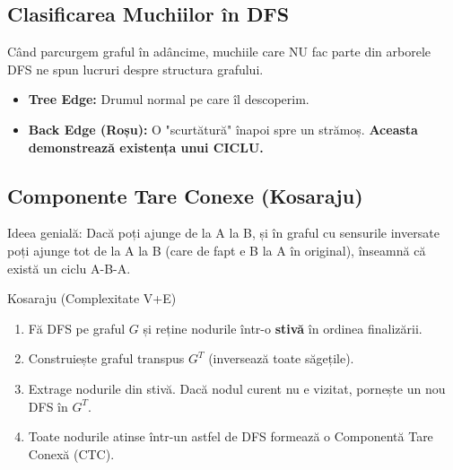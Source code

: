 \documentclass[a4paper,10pt]{article}
\begin{document}
\subsection{Clasificarea Muchiilor în DFS}
Când parcurgem graful în adâncime, muchiile care NU fac parte din arborele DFS ne spun lucruri despre structura grafului.

\begin{center}
\end{center}

\begin{intuition}
\begin{itemize}
    \item \textbf{Tree Edge:} Drumul normal pe care îl descoperim.
    \item \textbf{Back Edge (Roșu):} O "scurtătură" înapoi spre un strămoș. \textbf{Aceasta demonstrează existența unui CICLU.}
\end{itemize}
\end{intuition}

\subsection{Componente Tare Conexe (Kosaraju)}

\begin{intuition}
Ideea genială: Dacă poți ajunge de la A la B, și în graful cu sensurile inversate poți ajunge tot de la A la B (care de fapt e B la A în original), înseamnă că există un ciclu A-B-A.
\end{intuition}

\begin{algorithmbox}{Kosaraju (Complexitate V+E)}
\begin{enumerate}
    \item Fă DFS pe graful $G$ și reține nodurile într-o \textbf{stivă} în ordinea finalizării.
    \item Construiește graful transpus $G^T$ (inversează toate săgețile).
    \item Extrage nodurile din stivă. Dacă nodul curent nu e vizitat, pornește un nou DFS în $G^T$.
    \item Toate nodurile atinse într-un astfel de DFS formează o Componentă Tare Conexă (CTC).
\end{enumerate}
\end{algorithmbox}
\end{document}
